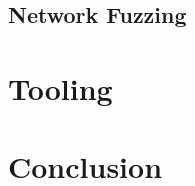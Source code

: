 \documentclass[journal=tosc,final]{iacrtrans}
\begin{document}
\subsection{Network Fuzzing}
\section{Tooling}
\section{Conclusion}





\end{document}
